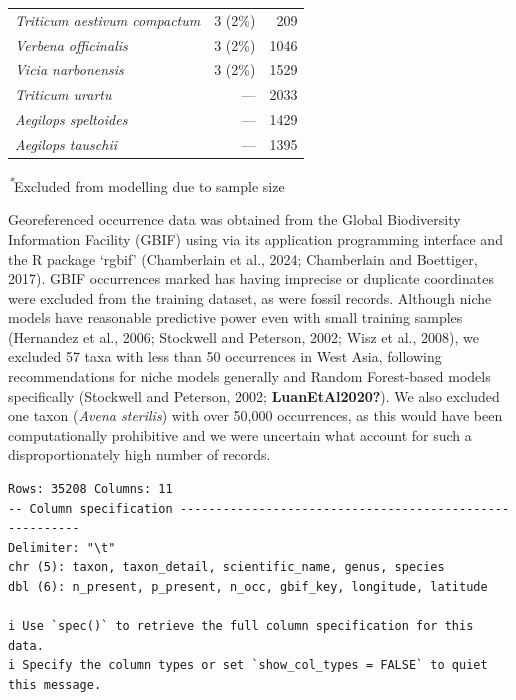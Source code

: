\documentclass[
  number,
  review]{elsarticle}
\begin{document}
\begin{table}
{\begin{tabular*}{\linewidth}{@{\extracolsep{\fill}}lrr}
\emph{Triticum aestivum compactum} & 3 (2\%) & 209 \\ 
\emph{Verbena officinalis} & 3 (2\%) & 1046 \\ 
\emph{Vicia narbonensis} & 3 (2\%) & 1529 \\ 
\emph{Triticum urartu} & — & 2033 \\ 
\emph{Aegilops speltoides} & — & 1429 \\ 
\emph{Aegilops tauschii} & — & 1395 \\ 
\bottomrule
\end{tabular*}
\begin{minipage}{\linewidth}
\textsuperscript{\textit{*}}Excluded from modelling due to sample size\\
\end{minipage}

}

\end{table}%

Georeferenced occurrence data was obtained from the Global Biodiversity
Information Facility (GBIF) using via its application programming
interface and the R package `rgbif' (Chamberlain et al., 2024;
Chamberlain and Boettiger, 2017). GBIF occurrences marked has having
imprecise or duplicate coordinates were excluded from the training
dataset, as were fossil records. Although niche models have reasonable
predictive power even with small training samples (Hernandez et al.,
2006; Stockwell and Peterson, 2002; Wisz et al., 2008), we excluded 57
taxa with less than 50 occurrences in West Asia, following
recommendations for niche models generally and Random Forest-based
models specifically (Stockwell and Peterson, 2002;
\textbf{LuanEtAl2020?}). We also excluded one taxon (\emph{Avena
sterilis}) with over 50,000 occurrences, as this would have been
computationally prohibitive and we were uncertain what account for such
a disproportionately high number of records.

\begin{verbatim}
Rows: 35208 Columns: 11
-- Column specification --------------------------------------------------------
Delimiter: "\t"
chr (5): taxon, taxon_detail, scientific_name, genus, species
dbl (6): n_present, p_present, n_occ, gbif_key, longitude, latitude

i Use `spec()` to retrieve the full column specification for this data.
i Specify the column types or set `show_col_types = FALSE` to quiet this message.
\end{verbatim}
\end{document}
